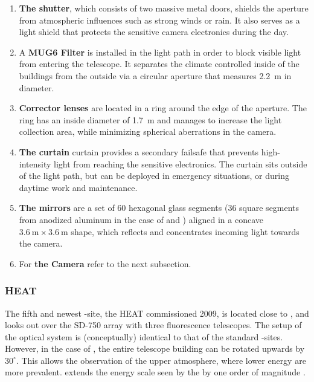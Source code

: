 \begin{enumerate}[label=(\Alph*)]
  \item \textbf{The shutter}, which consists of two massive metal doors, shields
  the aperture from atmospheric influences such as strong winds or rain. It also
  serves as a light shield that protects the sensitive camera electronics during
  the day.

  \item A \textbf{MUG6 \UV Filter} is installed in the light path in order to 
  block visible light from entering the telescope. It separates the climate 
  controlled inside of the \FD buildings from the outside via a circular
  aperture that measures \SI{2.2}{\meter} in diameter. 
  
  \item \textbf{Corrector lenses} are located in a ring around the edge of the 
  aperture. The ring has an inside diameter of \SI{1.7}{\meter} and manages to 
  increase the light collection area, while minimizing spherical aberrations in 
  the camera.

  \item \textbf{The curtain} curtain provides a secondary failsafe that prevents
  high-intensity light from reaching the sensitive electronics. The curtain 
  sits outside of the light path, but can be deployed in emergency situations, 
  or during daytime work and maintenance.

  \item \textbf{The mirrors} are a set of 60 hexagonal glass segments (36 square
  segments from anodized aluminum in the case of \LL and \LM) aligned in a 
  concave $\SI{3.6}{\meter}\times\SI{3.6}{\meter}$ shape, which reflects and 
  concentrates incoming light towards the camera.

  \item For \textbf{the Camera} refer to the next subsection.
\end{enumerate}

\subsubsection{\acf{HEAT}}
\label{sssec:HEAT}

The fifth and newest \FD-site, the \acl{HEAT} commissioned 2009, is located 
close to \CO, and looks out over the SD-750 array with three fluorescence 
telescopes. The setup of the optical system is (conceptually) identical to that 
of the standard \FD-sites. However, in the case of \HEAT, the entire telescope 
building can be rotated upwards by $30^\circ$. This allows the observation of 
the upper atmosphere, where lower energy \EASs are more prevalent. \HEAT extends
the energy scale seen by the \FD by one order of magnitude 
\cite{mathesHEATTelescopesPierre2011}.

